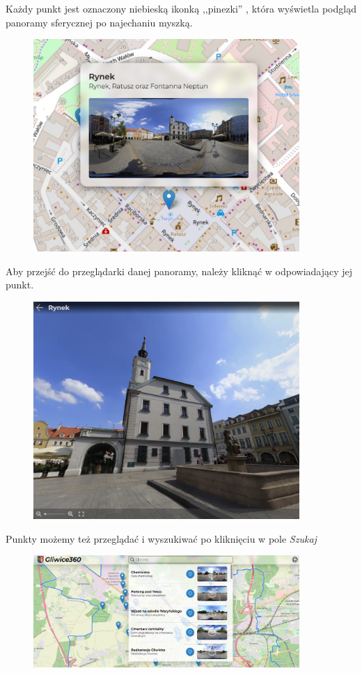 \documentclass[a4paper]{mwart}
\begin{document}
Każdy punkt jest oznaczony niebieską ikonką ,,pinezki'' , która wyświetla
podgląd panoramy
sferycznej po najechaniu myszką.
\begin{figure}[H]
\centering
\includegraphics[width=0.9\textwidth]{images/hover.jpg}
\end{figure}

Aby przejść do przeglądarki danej panoramy, należy kliknąć w odpowiadający jej 
punkt.
\begin{figure}[H]
\centering
\includegraphics[width=0.9\textwidth]{images/panoview.jpg}
\end{figure}

Punkty możemy też przeglądać i wyszukiwać po kliknięciu w pole \textit{Szukaj}
\begin{figure}[H]
\centering
\includegraphics[width=0.9\textwidth]{images/search.jpg}
\end{figure}
\end{document}
